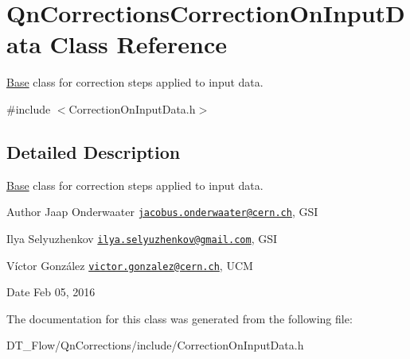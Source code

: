 \hypertarget{classQnCorrectionsCorrectionOnInputData}{}\section{Qn\+Corrections\+Correction\+On\+Input\+Data Class Reference}
\label{classQnCorrectionsCorrectionOnInputData}


\mbox{\hyperlink{classBase}{Base}} class for correction steps applied to input data.  




{\ttfamily \#include $<$Correction\+On\+Input\+Data.\+h$>$}



\subsection{Detailed Description}
\mbox{\hyperlink{classBase}{Base}} class for correction steps applied to input data. 

\begin{DoxyAuthor}{Author}
Jaap Onderwaater \href{mailto:jacobus.onderwaater@cern.ch}{\tt jacobus.\+onderwaater@cern.\+ch}, G\+SI 

Ilya Selyuzhenkov \href{mailto:ilya.selyuzhenkov@gmail.com}{\tt ilya.\+selyuzhenkov@gmail.\+com}, G\+SI 

Víctor González \href{mailto:victor.gonzalez@cern.ch}{\tt victor.\+gonzalez@cern.\+ch}, U\+CM 
\end{DoxyAuthor}
\begin{DoxyDate}{Date}
Feb 05, 2016 
\end{DoxyDate}


The documentation for this class was generated from the following file\+:\begin{DoxyCompactItemize}
\item 
D\+T\+\_\+\+Flow/\+Qn\+Corrections/include/Correction\+On\+Input\+Data.\+h\end{DoxyCompactItemize}
